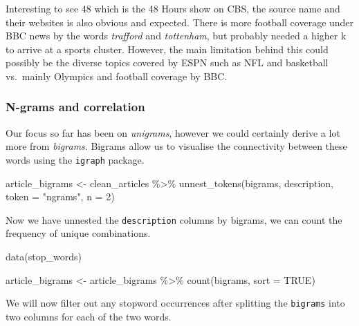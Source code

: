 \documentclass[
]{article}
\newenvironment{Shaded}{\begin{snugshade}}{\end{snugshade}}
\newcommand{\AttributeTok}[1]{\textcolor[rgb]{0.77,0.63,0.00}{#1}}
\newcommand{\ConstantTok}[1]{\textcolor[rgb]{0.00,0.00,0.00}{#1}}
\newcommand{\DecValTok}[1]{\textcolor[rgb]{0.00,0.00,0.81}{#1}}
\newcommand{\FunctionTok}[1]{\textcolor[rgb]{0.00,0.00,0.00}{#1}}
\newcommand{\NormalTok}[1]{#1}
\newcommand{\OtherTok}[1]{\textcolor[rgb]{0.56,0.35,0.01}{#1}}
\newcommand{\SpecialCharTok}[1]{\textcolor[rgb]{0.00,0.00,0.00}{#1}}
\newcommand{\StringTok}[1]{\textcolor[rgb]{0.31,0.60,0.02}{#1}}
\begin{document}
Interesting to see 48 which is the 48 Hours show on CBS, the source name
and their websites is also obvious and expected. There is more football
coverage under BBC news by the words \emph{trafford} and
\emph{tottenham}, but probably needed a higher k to arrive at a sports
cluster. However, the main limitation behind this could possibly be the
diverse topics covered by ESPN such as NFL and basketball vs.~mainly
Olympics and football coverage by BBC.

\hypertarget{n-grams-and-correlation}{%
\subsubsection{N-grams and correlation}\label{n-grams-and-correlation}}

Our focus so far has been on \emph{unigrams}, however we could certainly
derive a lot more from \emph{bigrams}. Bigrams allow us to visualise the
connectivity between these words using the \texttt{igraph} package.

\begin{Shaded}
\begin{Highlighting}[]
\NormalTok{article\_bigrams }\OtherTok{\textless{}{-}}\NormalTok{ clean\_articles }\SpecialCharTok{\%\textgreater{}\%}
                    \FunctionTok{unnest\_tokens}\NormalTok{(bigrams, description, }\AttributeTok{token =} \StringTok{"ngrams"}\NormalTok{, }\AttributeTok{n =} \DecValTok{2}\NormalTok{)}
\end{Highlighting}
\end{Shaded}

Now we have unnested the \texttt{description} columns by bigrams, we can
count the frequency of unique combinations.

\begin{Shaded}
\begin{Highlighting}[]
\FunctionTok{data}\NormalTok{(stop\_words)}

\NormalTok{article\_bigrams }\OtherTok{\textless{}{-}}\NormalTok{ article\_bigrams }\SpecialCharTok{\%\textgreater{}\%}
                    \FunctionTok{count}\NormalTok{(bigrams, }\AttributeTok{sort =} \ConstantTok{TRUE}\NormalTok{)}
\end{Highlighting}
\end{Shaded}

We will now filter out any stopword occurrences after splitting the
\texttt{bigrams} into two columns for each of the two words.
\end{document}

